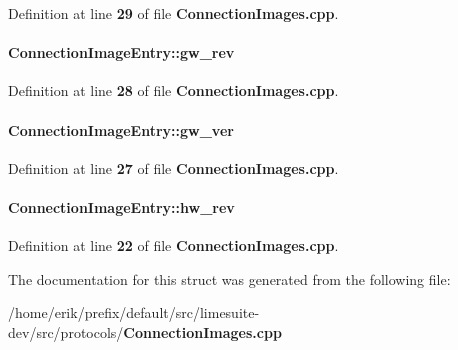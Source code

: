 Definition at line {\bf 29} of file {\bf Connection\+Images.\+cpp}.

\paragraph[{gw\+\_\+rev}]{ Connection\+Image\+Entry\+::gw\+\_\+rev}\label{structConnectionImageEntry_a96235b7d0021bb3148ef1c532b4d400e}


Definition at line {\bf 28} of file {\bf Connection\+Images.\+cpp}.

\paragraph[{gw\+\_\+ver}]{ Connection\+Image\+Entry\+::gw\+\_\+ver}\label{structConnectionImageEntry_a3494fb3b7bc7c8f36f1a3f227b0e1678}


Definition at line {\bf 27} of file {\bf Connection\+Images.\+cpp}.

\paragraph[{hw\+\_\+rev}]{ Connection\+Image\+Entry\+::hw\+\_\+rev}\label{structConnectionImageEntry_a8db5ed1ee1890473313e93862d0ace51}


Definition at line {\bf 22} of file {\bf Connection\+Images.\+cpp}.



The documentation for this struct was generated from the following file\+:\begin{DoxyCompactItemize}
\item 
/home/erik/prefix/default/src/limesuite-\/dev/src/protocols/{\bf Connection\+Images.\+cpp}\end{DoxyCompactItemize}
